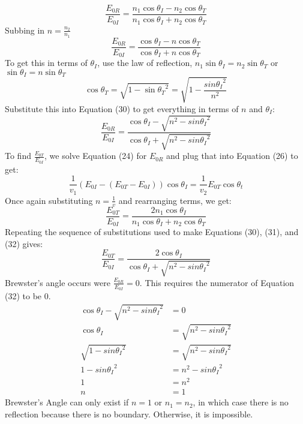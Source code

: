 \documentclass{report}
\begin{document}
\begin{itemize}
\begin{equation}
  \frac{E_{0R}}{E_{0I}} = \frac{n_1\cos{\theta_I}-n_2\cos{\theta_T}}{n_1\cos{\theta_I}+n_2\cos{\theta_T}}
\end{equation}
Subbing in $n=\frac{n_2}{n_1}$
\begin{equation}
  \frac{E_{0R}}{E_{0I}} = \frac{\cos{\theta_I}-n\cos{\theta_T}}{\cos{\theta_I}+n\cos{\theta_T}}
\end{equation}
To get this in terms of $\theta_I$, use the law of reflection, $n_1\sin{\theta_I}=n_2\sin{\theta_T}$ or $\sin{\theta_I}=n\sin{\theta_T}$
\begin{equation}
  \cos{\theta_T} = \sqrt{1-\sin{\theta_T}^2} = \sqrt{1-\frac{sin{\theta_I}^2}{n^2}}
\end{equation}
Substitute this into Equation (30) to get everything in terms of $n$ and $\theta_I$:
\begin{equation}
  \frac{E_{0R}}{E_{0I}} = \frac{\cos{\theta_I}-\sqrt{n^2-sin{\theta_I}^2}}{\cos{\theta_I}+\sqrt{n^2-sin{\theta_I}^2}}
\end{equation}
To find $\frac{E_{0T}}{E_{0I}}$, we solve Equation (24) for $E_{0R}$ and plug that into Equation (26) to get:
\begin{equation}
  \frac{1}{v_1} (E_{0I}-(E_{0T}-E_{0I}))\cos{\theta_I}  = \frac{1}{v_2} E_{0T}\cos{\theta_t}
\end{equation}
Once again substituting $n=\frac{1}{v}$ and rearranging terms, we get:
\begin{equation}
  \frac{E_{0T}}{E_{0I}} = \frac{2n_1\cos{\theta_I}}{n_1\cos{\theta_I}+n_2\cos{\theta_T}}
\end{equation}
Repeating the sequence of substitutions used to make Equations (30), (31), and (32) gives:
\begin{equation}
  \frac{E_{0T}}{E_{0I}} = \frac{2\cos{\theta_I}}{\cos{\theta_I}+\sqrt{n^2-sin{\theta_I}^2}}
\end{equation}
Brewster's angle occurs were $\frac{E_{0R}}{E_{0I}} = 0$. This requires the numerator of Equation (32) to be 0.
\begin{align}
  \cos{\theta_I}-\sqrt{n^2-sin{\theta_I}^2} & = 0\\
  \cos{\theta_I} & =\sqrt{n^2-sin{\theta_I}^2}\\
  \sqrt{1-sin{\theta_I}^2}& = \sqrt{n^2-sin{\theta_I}^2}\\
1-sin{\theta_I}^2 &=n^2-sin{\theta_I}^2\\
1&=n^2\\
n&=1
\end{align}
Brewster's Angle can only exist if $n=1$ or $n_1 = n_2$, in which case there is no reflection because there is no boundary. Otherwise, it is impossible.

  \end{itemize}
   
\end{document}
